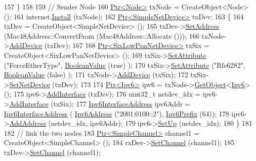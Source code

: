 \begin{DoxyCode}
157   \}
158 
159   \textcolor{comment}{// Sender Node}
160   \hyperlink{classns3_1_1Ptr}{Ptr<Node>} txNode = CreateObject<Node> ();
161   internet.\hyperlink{classns3_1_1InternetStackHelper_a6645b412f31283d2d9bc3d8a95cebbc0}{Install} (txNode);
162   \hyperlink{classns3_1_1Ptr}{Ptr<SimpleNetDevice>} txDev;
163   \{
164     txDev = CreateObject<SimpleNetDevice> ();
165     txDev->\hyperlink{classns3_1_1SimpleNetDevice_a968ef3e7318bac29d5f1d7d977029af4}{SetAddress} (Mac48Address::ConvertFrom (Mac48Address::Allocate ()));
166     txNode->\hyperlink{classns3_1_1Node_a42ff83ee1d5d1649c770d3f5b62375de}{AddDevice} (txDev);
167 
168     \hyperlink{classns3_1_1Ptr}{Ptr<SixLowPanNetDevice>} txSix = CreateObject<SixLowPanNetDevice> ();
169     txSix->\hyperlink{classns3_1_1ObjectBase_ac60245d3ea4123bbc9b1d391f1f6592f}{SetAttribute} (\textcolor{stringliteral}{"ForceEtherType"}, \hyperlink{classns3_1_1BooleanValue}{BooleanValue} (\textcolor{keyword}{true}) );
170     txSix->\hyperlink{classns3_1_1ObjectBase_ac60245d3ea4123bbc9b1d391f1f6592f}{SetAttribute} (\textcolor{stringliteral}{"Rfc6282"}, \hyperlink{classns3_1_1BooleanValue}{BooleanValue} (\textcolor{keyword}{false}) );
171     txNode->\hyperlink{classns3_1_1Node_a42ff83ee1d5d1649c770d3f5b62375de}{AddDevice} (txSix);
172     txSix->\hyperlink{classns3_1_1SixLowPanNetDevice_a81c74a5dc06e3fbad1a8b1c59d1f68fa}{SetNetDevice} (txDev);
173 
174     \hyperlink{classns3_1_1Ptr}{Ptr<Ipv6>} ipv6 = txNode->\hyperlink{classns3_1_1Object_a13e18c00017096c8381eb651d5bd0783}{GetObject}<\hyperlink{classns3_1_1Ipv6}{Ipv6}> ();
175     ipv6->\hyperlink{classns3_1_1Ipv6_a4fd7da82c16b8abf9ca15f982918e6a4}{AddInterface} (txDev);
176     uint32\_t netdev\_idx = ipv6->\hyperlink{classns3_1_1Ipv6_a4fd7da82c16b8abf9ca15f982918e6a4}{AddInterface} (txSix);
177     \hyperlink{classns3_1_1Ipv6InterfaceAddress}{Ipv6InterfaceAddress} ipv6Addr = \hyperlink{classns3_1_1Ipv6InterfaceAddress}{Ipv6InterfaceAddress} (
      \hyperlink{classns3_1_1Ipv6Address}{Ipv6Address} (\textcolor{stringliteral}{"2001:0100::2"}), \hyperlink{classns3_1_1Ipv6Prefix}{Ipv6Prefix} (64));
178     ipv6->\hyperlink{classns3_1_1Ipv6_a5cd576e83cf65445be3a0b5ffd1ddc5c}{AddAddress} (netdev\_idx, ipv6Addr);
179     ipv6->\hyperlink{classns3_1_1Ipv6_a8e61d85ec7fd342ed38fef2d040ed1b9}{SetUp} (netdev\_idx);
180   \}
181 
182   \textcolor{comment}{// link the two nodes}
183   \hyperlink{classns3_1_1Ptr}{Ptr<SimpleChannel>} channel1 = CreateObject<SimpleChannel> ();
184   rxDev->\hyperlink{classns3_1_1SimpleNetDevice_af9e9828ad584b5ba538f18f645f162e0}{SetChannel} (channel1);
185   txDev->\hyperlink{classns3_1_1SimpleNetDevice_af9e9828ad584b5ba538f18f645f162e0}{SetChannel} (channel1);

\end{DoxyCode}
